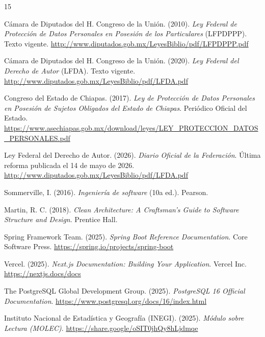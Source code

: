 \documentclass[12pt, atypical, journal]{article}
\begin{document}
\newpage



\begin{thebibliography}{15}

Cámara de Diputados del H. Congreso de la Unión. (2010). \textit{Ley Federal de Protección de Datos Personales en Posesión de los Particulares} (LFPDPPP). Texto vigente. \url{http://www.diputados.gob.mx/LeyesBiblio/pdf/LFPDPPP.pdf}

Cámara de Diputados del H. Congreso de la Unión. (2020). \textit{Ley Federal del Derecho de Autor} (LFDA). Texto vigente. \url{http://www.diputados.gob.mx/LeyesBiblio/pdf/LFDA.pdf}

Congreso del Estado de Chiapas. (2017). \textit{Ley de Protección de Datos Personales en Posesión de Sujetos Obligados del Estado de Chiapas}. Periódico Oficial del Estado. \url{https://www.asechiapas.gob.mx/download/leyes/LEY_PROTECCION_DATOS_PERSONALES.pdf}

Ley Federal del Derecho de Autor. (2026). \textit{Diario Oficial de la Federación}. Última reforma publicada el 14 de mayo de 2026. \url{http://www.diputados.gob.mx/LeyesBiblio/pdf/LFDA.pdf}

Sommerville, I. (2016). \textit{Ingeniería de software} (10a ed.). Pearson.

Martin, R. C. (2018). \textit{Clean Architecture: A Craftsman's Guide to Software Structure and Design}. Prentice Hall.

Spring Framework Team. (2025). \textit{Spring Boot Reference Documentation}. Core Software Press. \url{https://spring.io/projects/spring-boot}

Vercel. (2025). \textit{Next.js Documentation: Building Your Application}. Vercel Inc. \url{https://nextjs.docs/docs}

The PostgreSQL Global Development Group. (2025). \textit{PostgreSQL 16 Official Documentation}. \url{https://www.postgresql.org/docs/16/index.html}

Instituto Nacional de Estadística y Geografía (INEGI). (2025). \textit{Módulo sobre Lectura (MOLEC)}. \url{https://share.google/oSIT0jhQy8hLjdmqe}


\end{thebibliography}
\end{document}
